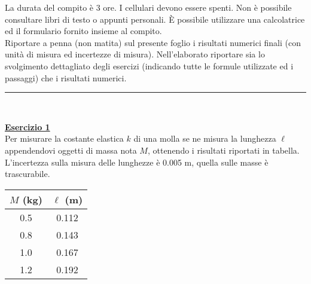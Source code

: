 \documentclass[10pt,a4paper,fleqn]{article}
\begin{document}
La durata del compito \`e 3 ore. I cellulari devono essere spenti. Non \`e possibile consultare libri
di testo o appunti personali. \`E possibile utilizzare una
calcolatrice ed il formulario fornito insieme al compito. \\
Riportare a penna (non matita) sul presente foglio i risultati
numerici finali (con unit\`a di misura
ed incertezze di misura). Nell'elaborato riportare sia lo svolgimento
dettagliato degli esercizi (indicando tutte le formule utilizzate ed i passaggi) che i risultati numerici. 

\vspace{0.3cm}
\noindent\rule{18cm}{0.4pt}  \\

\enlargethispage{0.2cm}
\normalsize


\vskip0.30cm {\bf \underline {Esercizio 1}} \\
Per misurare la costante elastica $k$ di una molla se ne misura la
lunghezza $\ell$ appendendovi oggetti di massa nota $M$, ottenendo i risultati riportati in
tabella. L'incertezza sulla misura delle lunghezze \`e 0.005 m, quella sulle
masse \`e trascurabile.

\begin{table}[h]
\begin{tabular}{|c|c|}
\hline
$M$ (kg) & $\ell$ (m) \\
\hline
0.5 & 0.112 \\ 
0.8 & 0.143 \\
1.0 & 0.167 \\
1.2 & 0.192 \\
\hline
\end{tabular}
\end{table}
\end{document}
